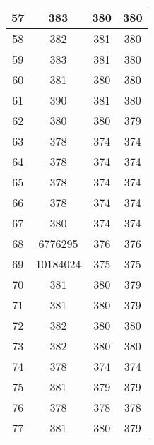 \begin{minipage}{5cm}
\begin{table}[H]
{\begin{tabular}{|c|c|c|c|}
    \hline
    57 & 383 & 380 & 380 \\
    \hline
    58 & 382 & 381 & 380 \\
    \hline
    59 & 383 & 381 & 380 \\
    \hline
    60 & 381 & 380 & 380 \\
    \hline
    61 & 390 & 381 & 380 \\
    \hline
    62 & 380 & 380 & 379 \\
    \hline
    63 & 378 & 374 & 374 \\
    \hline
    64 & 378 & 374 & 374 \\
    \hline
    65 & 378 & 374 & 374 \\
    \hline
    66 & 378 & 374 & 374 \\
    \hline
    67 & 380 & 374 & 374 \\
    \hline
    68 & 6776295 & 376 & 376 \\
    \hline
    69 & 10184024 & 375 & 375 \\
    \hline
    70 & 381 & 380 & 379 \\
    \hline
    71 & 381 & 380 & 379 \\
    \hline
    72 & 382 & 380 & 380 \\
    \hline
    73 & 382 & 380 & 380 \\
    \hline
    74 & 378 & 374 & 374 \\
    \hline
    75 & 381 & 379 & 379 \\
    \hline
    76 & 378 & 378 & 378 \\
    \hline
    77 & 381 & 380 & 379 \\
    \hline
    \end{tabular}
    }
    \end{table}
\end{minipage}
